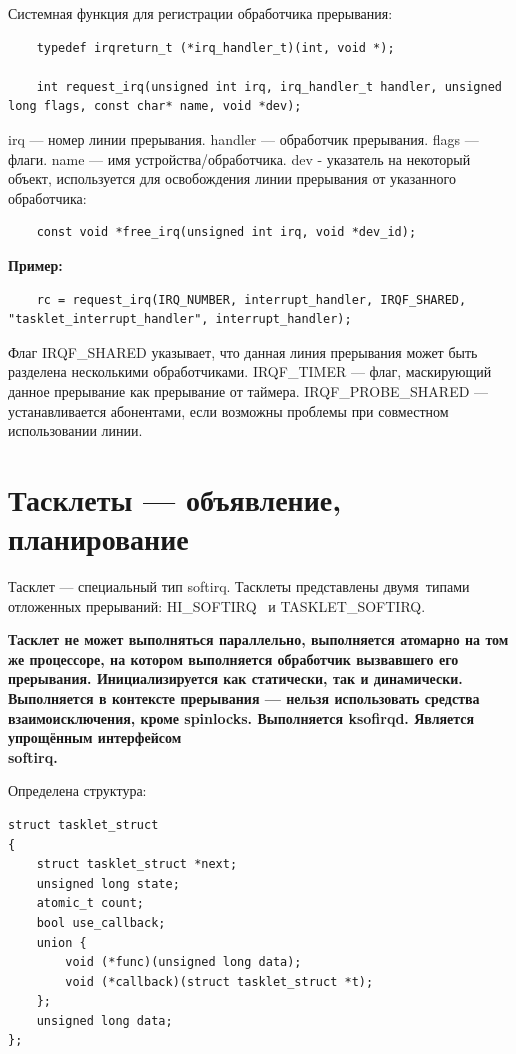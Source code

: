 Системная функция для регистрации обработчика прерывания:

\begin{lstlisting}
	typedef irqreturn_t (*irq_handler_t)(int, void *); 
	
	int request_irq(unsigned int irq, irq_handler_t handler, unsigned long flags, const char* name, void *dev);
\end{lstlisting}

irq --- номер линии прерывания. handler --- обработчик прерывания. flags --- флаги. name --- имя устройства/обработчика. dev - указатель на некоторый объект, используется для освобождения линии прерывания от указанного обработчика:

\begin{lstlisting}
	const void *free_irq(unsigned int irq, void *dev_id);
\end{lstlisting}

\textbf{Пример:}
\begin{lstlisting}
	rc = request_irq(IRQ_NUMBER, interrupt_handler, IRQF_SHARED, "tasklet_interrupt_handler", interrupt_handler);
\end{lstlisting}

Флаг IRQF\_SHARED указывает, что данная линия прерывания может быть разделена несколькими обработчиками. IRQF\_TIMER --- флаг, маскирующий данное прерывание как прерывание от таймера. IRQF\_PROBE\_SHARED --- устанавливается абонентами, если возможны проблемы при совместном использовании линии.

\section{Тасклеты --- объявление, планирование}

Тасклет --- специальный тип softirq. Тасклеты представлены двумя типами отложенных прерываний: HI\_SOFTIRQ  и TASKLET\_SOFTIRQ.

\textbf{Тасклет не может выполняться параллельно, выполняется атомарно на том же процессоре, на котором выполняется обработчик вызвавшего его прерывания. Инициализируется как статически, так и динамически. Выполняется в контексте прерывания --- нельзя использовать средства взаимоисключения, кроме spinlocks. Выполняется ksofirqd. Является упрощённым интерфейсом \\ softirq.}

Определена структура:

\begin{lstlisting}
struct tasklet_struct
{
	struct tasklet_struct *next;
	unsigned long state;
	atomic_t count;
	bool use_callback;
	union {
		void (*func)(unsigned long data);
		void (*callback)(struct tasklet_struct *t);
	};
	unsigned long data;
};
\end{lstlisting}

